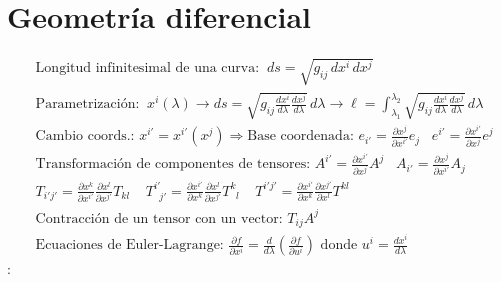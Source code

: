 \section*{Geometría diferencial}
\begin{align*}
& \text{Longitud infinitesimal de una curva:} \;\; ds = \sqrt{g_{ij}\, dx^i\, dx^j} \\
& \text{Parametrización:} \;\; x^i(\lambda)  \rightarrow  ds = \sqrt{g_{ij} \frac{dx^i}{d\lambda} \frac{dx^j}{d\lambda}}\, d\lambda   \rightarrow \ell= \int_{\lambda_1}^{\lambda_2} \sqrt{g_{ij} \frac{dx^i}{d\lambda} \frac{dx^j}{d\lambda}}\, d\lambda\\
&\text{Cambio coords.: } x^{i'}=x^{i'}(x^j) \Rightarrow \text{Base coordenada: } e_{i'}=\frac{\partial x^j}{\partial x^{i'}}e_j \; \; \; e^{i'}=\frac{\partial x^{i'}}{\partial x^{j}} e^{j}\\
&\text{Transformación de componentes de tensores: } A^{i'}= \frac{\partial x^{i'}}{\partial x^j}A^j \; \; \; A_{i'}= \frac{\partial x^j}{\partial x^{i'}}A_j\\
&T_{i'j'}=\frac{\partial x^k}{\partial x^{i'}} \frac{\partial x^l}{\partial x^{j'}} T_{kl}\;\;\;\; T^{i'}_{\; \;j'}=\frac{\partial x^{i'}}{\partial x^k}\frac{\partial x^l}{\partial x^{j'}}T^k_{\;\;l} \; \; \; \; T^{i'j'}=\frac{\partial x^{i'}}{\partial x^k}\frac{\partial x^{j'}}{\partial x^l} T^{kl}\\
&\text{Contracción de un tensor con un vector: } T_{ij}A^j\\
&\text{Ecuaciones de Euler-Lagrange: } \frac{\partial f}{\partial x^i} = \frac{d}{d\lambda} \left(\frac{\partial f}{\partial u^i}\right)\text{ donde } u^i=\frac{dx^i}{d \lambda}
\end{align*}
\underline{}:
